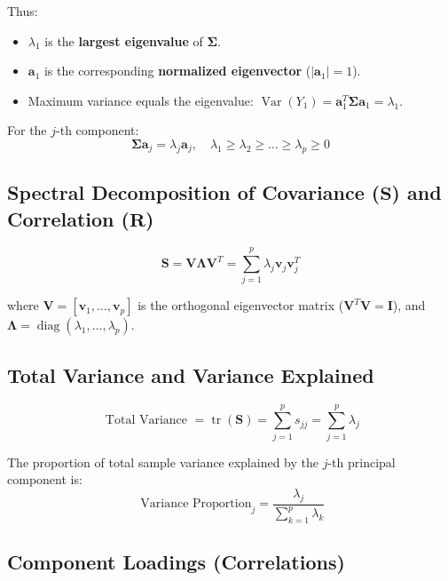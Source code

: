 \documentclass[
]{article}
\begin{document}
Thus:

\begin{itemize}
\item
  \(\lambda_{1}\) is the \textbf{largest eigenvalue} of
  \(\mathbf{\Sigma}\).
\item
  \(\mathbf{a}_{1}\) is the corresponding \textbf{normalized
  eigenvector} (\(|\mathbf{a}_{1}| = 1\)).
\item
  Maximum variance equals the eigenvalue:
  \(\operatorname{Var}(Y_{1}) = \mathbf{a}_{1}^{T}\mathbf{\Sigma}\mathbf{a}_{1} = \lambda_{1}\).
\end{itemize}

For the \(j\)-th component:
\[\mathbf{\Sigma}\mathbf{a}_{j} = \lambda_{j}\mathbf{a}_{j},\quad\lambda_{1} \geq \lambda_{2} \geq \ldots \geq \lambda_{p} \geq 0\]

\textbf{ }

\subsection{\texorpdfstring{Spectral Decomposition of Covariance
(\(\mathbf{S}\)) and Correlation
(\(\mathbf{R}\))}{Spectral Decomposition of Covariance (\textbackslash mathbf\{S\}) and Correlation (\textbackslash mathbf\{R\})}}

\[\mathbf{S} = \mathbf{V}\mathbf{\Lambda}\mathbf{V}^{T} = \sum_{j = 1}^{p}\lambda_{j}\mathbf{v}_{j}\mathbf{v}_{j}^{T}\]

where
\(\mathbf{V} = \left\lbrack \mathbf{v}_{1},\ldots,\mathbf{v}_{p} \right\rbrack\)
is the orthogonal eigenvector matrix
(\(\mathbf{V}^{T}\mathbf{V} = \mathbf{I}\)), and
\(\mathbf{\Lambda} = \operatorname{diag}(\lambda_{1},\ldots,\lambda_{p})\).

\textbf{ }

\subsection{Total Variance and Variance Explained}

\[\text{ Total Variance } = \operatorname{tr}(\mathbf{S}) = \sum_{j = 1}^{p}s_{jj} = \sum_{j = 1}^{p}\lambda_{j}\]

The proportion of total sample variance explained by the \(j\)-th
principal component is:
\[\text{ Variance Proportion}_{j} = \frac{\lambda_{j}}{\sum_{k = 1}^{p}\lambda_{k}}\]

\textbf{ }

\subsection{Component Loadings (Correlations)}
\end{document}
